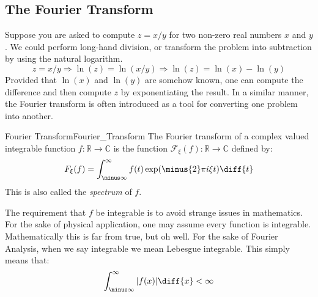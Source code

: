     \subsection{The Fourier Transform}
        Suppose you are asked to compute $z=x/y$ for
        two non-zero real numbers $x$ and $y$. We could perform
        long-hand division, or transform the problem into
        subtraction by using the natural logarithm.
        \begin{equation}
            z=x/y\Rightarrow
            \ln(z)=\ln(x/y)\Rightarrow
            \ln(z)=\ln(x)-\ln(y)
        \end{equation}
        Provided that $\ln(x)$ and $\ln(y)$ are somehow known,
        one can compute the difference and then compute $z$
        by exponentiating the result. In a similar manner, the
        Fourier transform is often introduced as a tool for
        converting one problem into another.
        \begin{ldefinition}{Fourier Transform}{Fourier_Transform}
            The Fourier transform of a complex valued integrable function
            $f:\mathbb{R}\rightarrow\mathbb{C}$ is the function
            $\mathcal{F}_{\xi}(f):\mathbb{R}\rightarrow\mathbb{C}$ defined by:
            \begin{equation}
                F_{\xi}(f)=\int_{\minus\infty}^{\infty}f(t)
                    \exp(\minus{2}\pi{i}\xi{t})\diff{t}
            \end{equation}
            This is also called the \textit{spectrum} of $f$.
        \end{ldefinition}
        The requirement that $f$ be integrable is to avoid
        strange issues in mathematics. For the sake of
        physical application, one may assume every function
        is integrable. Mathematically this is far from true,
        but oh well. For the sake of Fourier Analysis, when
        we say integrable we mean Lebesgue integrable. This
        simply means that:
        \begin{equation}
            \int_{\minus\infty}^{\infty}|f(x)|\diff{x}<\infty
        \end{equation}
